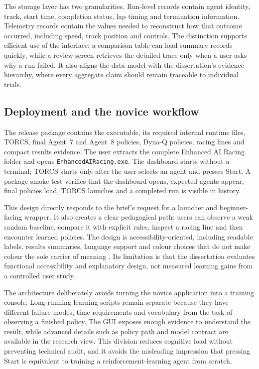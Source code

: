The storage layer has two granularities. Run-level records contain agent identity, track, start time, completion status, lap timing and termination information. Telemetry records contain the values needed to reconstruct how that outcome occurred, including speed, track position and controls. The distinction supports efficient use of the interface: a comparison table can load summary records quickly, while a review screen retrieves the detailed trace only when a user asks why a run failed. It also aligns the data model with the dissertation's evidence hierarchy, where every aggregate claim should remain traceable to individual trials.

\subsection{Deployment and the novice workflow}

The release package contains the executable, its required internal runtime files, TORCS, final Agent~7 and Agent~8 policies, Dyna-Q policies, racing lines and compact results evidence. The user extracts the complete Enhanced AI Racing folder and opens \texttt{EnhancedAIRacing.exe}. The dashboard starts without a terminal; TORCS starts only after the user selects an agent and presses Start. A package smoke test verifies that the dashboard opens, expected agents appear, final policies load, TORCS launches and a completed run is visible in history.

This design directly responds to the brief's request for a launcher and beginner-facing wrapper. It also creates a clear pedagogical path: users can observe a weak random baseline, compare it with explicit rules, inspect a racing line and then encounter learned policies. The design is accessibility-oriented, including readable labels, results summaries, language support and colour choices that do not make colour the sole carrier of meaning \parencite{wcag22}. Its limitation is that the dissertation evaluates functional accessibility and explanatory design, not measured learning gains from a controlled user study.

The architecture deliberately avoids turning the novice application into a training console. Long-running learning scripts remain separate because they have different failure modes, time requirements and vocabulary from the task of observing a finished policy. The GUI exposes enough evidence to understand the result, while advanced details such as policy path and model contract are available in the research view. This division reduces cognitive load without preventing technical audit, and it avoids the misleading impression that pressing Start is equivalent to training a reinforcement-learning agent from scratch.


